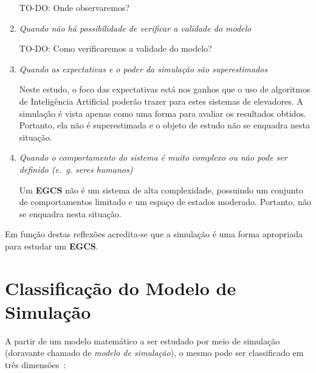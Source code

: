 \begin{enumerate}
TO-DO: Onde observaremos? %

\item \textit{Quando não há possibilidade de verificar a validade do modelo}

TO-DO: Como verificaremos a validade do modelo? %

\item \textit{Quando as expectativas e o poder da simulação são superestimados}

Neste estudo, o foco das expectativas está nos ganhos que o uso de algoritmos de
Inteligência Artificial poderão trazer para estes sistemas de elevadores. A
simulação é vista apenas como uma forma para avaliar os resultados obtidos.
Portanto, ela não é superestimada e o objeto de estudo não se enquadra nesta
situação.

\item \textit{Quando o comportamento do sistema é muito complexo ou não pode ser
definido (e.~g. seres humanos)}

Um \textbf{EGCS} não é um sistema de alta complexidade, possuindo um conjunto de
comportamentos limitado e um espaço de estados moderado. Portanto, não se
enquadra nesta situação.

\end{enumerate}

Em função destas reflexões acredita-se que a simulação é uma forma apropriada
para estudar um \textbf{EGCS}.

\section{Classificação do Modelo de Simulação}

A partir de um modelo matemático a ser estudado por meio de simulação (doravante
chamado de \textit{modelo de simulação}), o mesmo pode ser classificado em três
dimensões~\cite{Banks,Law}:

